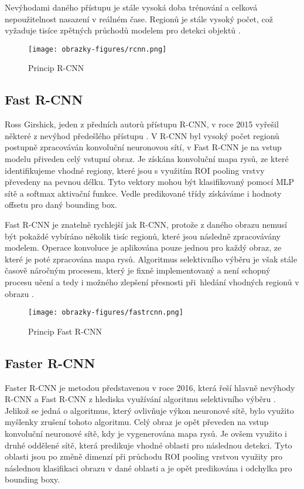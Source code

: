Nevýhodami daného přístupu je stále vysoká doba trénování a celková nepoužitelnost nasazení v reálném čase. Regionů je stále vysoký počet, což vyžaduje tisíce zpětných průchodů modelem pro detekci objektů \cite{ObjectDetectionAlgorithms}.

\begin{figure}[!htbp]
    \centering
    \texttt{[image: obrazky-figures/rcnn.png]}
    \caption{Princip R-CNN \cite{ObjectDetectionAlgorithms}}
\end{figure} 

\subsection*{Fast R-CNN}
Ross Girshick, jeden z předních autorů přístupu R-CNN, v roce 2015 vyřešil některé z nevýhod předešlého přístupu \cite{FastRCNN}. V R-CNN byl vysoký počet regionů postupně zpracováván konvoluční neuronovou sítí, v Fast R-CNN je na vstup modelu přiveden celý vstupní obraz. Je získána konvoluční mapa rysů, ze které identifikujeme vhodné regiony, které jsou s využitím ROI pooling vrstvy převedeny na pevnou délku. Tyto vektory mohou být klasifikovaný pomocí MLP sítě a softmax aktivační funkce. Vedle predikované třídy získáváme i hodnoty offsetu pro daný bounding box.

Fast R-CNN je znatelně rychlejší jak R-CNN, protože z daného obrazu nemusí být pokaždé vybíráno několik tisíc regionů, které jsou následně zpracovávány modelem. Operace konvoluce je aplikována pouze jednou pro každý obraz, ze které je poté zpracována mapa rysů. Algoritmus selektivního výběru je však stále časově náročným procesem, který je fixně implementovaný a není schopný procesu učení a tedy i možného zlepšení přesnosti při~hledání vhodných regionů v obrazu \cite{ObjectDetectionAlgorithms}.

\begin{figure}[!htbp]
    \centering
    \texttt{[image: obrazky-figures/fastrcnn.png]}
    \caption{Princip Fast R-CNN \cite{ObjectDetectionAlgorithms}}
\end{figure} 

\subsection*{Faster R-CNN}
Faster R-CNN je metodou představenou v roce 2016, která řeší hlavně nevýhody R-CNN a Fast R-CNN z hlediska využívání algoritmu selektivního výběru \cite{FasterRCNN}. Jelikož se jedná o algoritmus, který ovlivňuje výkon neuronové sítě, bylo využito myšlenky zrušení tohoto algoritmu. Celý obraz je opět převeden na vstup konvoluční neuronové sítě, kdy je vygenerována mapa rysů. Je ovšem využito i druhé oddělené sítě, která predikuje vhodné oblasti pro následnou detekci. Tyto oblasti jsou po změně dimenzí při průchodu ROI pooling vrstvou využity pro následnou klasifikaci obrazu v dané oblasti a je opět predikována i odchylka pro bounding boxy.

